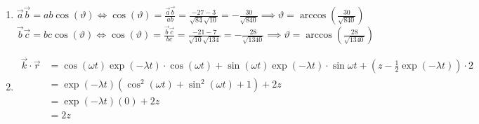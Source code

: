 \documentclass{gadsescript}
\begin{document}
\begin{enumerate}[label=\alph*)]
	\item $\vec a \vec b = ab \cos(\vartheta) \iff \cos(\vartheta) =  =  = - \implies \vartheta = \arccos()$\\
		$\vec b \vec c = bc \cos(\vartheta) \iff \cos(\vartheta) =  =  = - \implies \vartheta = \arccos()$
	\item \begin{align*}
			\vec k \cdot \vec r &= \cos(\omega t)\exp(-\lambda t) \cdot \cos(\omega t) + \sin(\omega t) \exp(-\lambda t) \cdot \sin{\omega t} + \left( z - \frac{1}{2}\exp(-\lambda t) \right) \cdot 2\\
			~&= \exp(-\lambda t) \left( \cos^2(\omega t) + \sin^2(\omega t) + 1\right) + 2z\\
			~&= \exp(-\lambda t) (0) + 2z\\
			~&= 2z
	\end{align*}

\end{enumerate}
\end{document}
